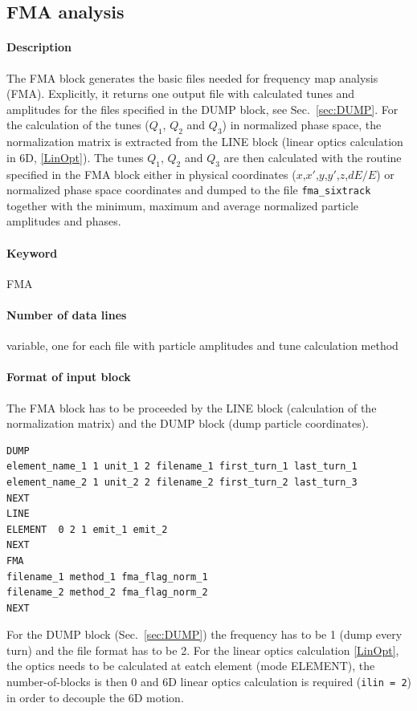 \documentclass[a4paper,11pt]{report}
\begin{document}
\subsection{FMA analysis} \label{sec:FMA}

\paragraph{Description}
The FMA block generates the basic files needed for frequency map analysis (FMA). Explicitly, it returns one output file with calculated tunes and amplitudes for the files specified in the DUMP block, see Sec.~\ref{sec:DUMP}. For the calculation of the tunes ($Q_1$, $Q_2$ and $Q_3$) in normalized phase space, the normalization matrix is extracted from the LINE block (linear optics calculation in 6D, \ref{LinOpt}). The tunes $Q_1$, $Q_2$ and $Q_3$ are then calculated with the routine specified in the FMA block either in physical coordinates ($x$,$x'$,$y$,$y'$,$z$,$dE/E$) or normalized phase space coordinates and dumped to the file \verb|fma_sixtrack| together with the minimum, maximum and average normalized particle amplitudes and phases. 

\paragraph{Keyword}
FMA

\paragraph{Number of data lines}
variable, one for each file with particle amplitudes and tune calculation method

\paragraph{Format of input block}
The FMA block has to be proceeded by the LINE block (calculation of the normalization matrix) and the DUMP block (dump particle coordinates).
\begin{verbatim}
DUMP
element_name_1 1 unit_1 2 filename_1 first_turn_1 last_turn_1
element_name_2 1 unit_2 2 filename_2 first_turn_2 last_turn_3
NEXT
LINE
ELEMENT  0 2 1 emit_1 emit_2
NEXT
FMA
filename_1 method_1 fma_flag_norm_1
filename_2 method_2 fma_flag_norm_2
NEXT
\end{verbatim}
For the DUMP block (Sec.~\ref{sec:DUMP}) the frequency has to be 1 (dump every turn) and the file format has to be 2. For the linear optics calculation \ref{LinOpt}, the optics needs to be calculated at eatch element (mode ELEMENT), the number-of-blocks is then 0 and 6D linear optics calculation is required (\verb|ilin = 2|) in order to decouple the 6D motion. 
\end{document}
